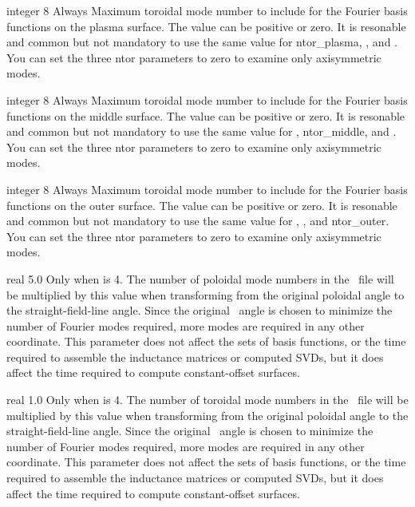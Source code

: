 \myhrule

{integer}
{8}
{Always}
{Maximum toroidal mode number to include for the Fourier basis functions on the plasma surface. The value can be positive or zero.
It is resonable and common but not mandatory to use the same value for {\ttfamily ntor\_plasma}, , and .
You can set the three {\ttfamily ntor} parameters to zero to examine only axisymmetric modes.}

\myhrule

{integer}
{8}
{Always}
{Maximum toroidal mode number to include for the Fourier basis functions on the middle surface. The value can be positive or zero.
It is resonable and common but not mandatory to use the same value for , {\ttfamily ntor\_middle}, and .
You can set the three {\ttfamily ntor} parameters to zero to examine only axisymmetric modes.}

\myhrule

{integer}
{8}
{Always}
{Maximum toroidal mode number to include for the Fourier basis functions on the outer surface. The value can be positive or zero.
It is resonable and common but not mandatory to use the same value for , , and {\ttfamily ntor\_outer}.
You can set the three {\ttfamily ntor} parameters to zero to examine only axisymmetric modes.}

\myhrule

{real}
{5.0}
{Only when  is 4.}
{The number of poloidal mode numbers in the \vmec~file will be multiplied by this value
when transforming from the original poloidal angle to the straight-field-line angle.
Since the original \vmec~angle is chosen to minimize the number of Fourier modes required,
more modes are required in any other coordinate.
This parameter does not affect the sets of basis functions,
or the time required to assemble the inductance matrices or
computed SVDs, but it does affect the time required to compute constant-offset surfaces.
}

\myhrule

{real}
{1.0}
{Only when  is 4.}
{The number of toroidal mode numbers in the \vmec~file will be multiplied by this value
when transforming from the original poloidal angle to the straight-field-line angle.
Since the original \vmec~angle is chosen to minimize the number of Fourier modes required,
more modes are required in any other coordinate.
This parameter does not affect the sets of basis functions,
or the time required to assemble the inductance matrices or
computed SVDs, but it does affect the time required to compute constant-offset surfaces.
}

